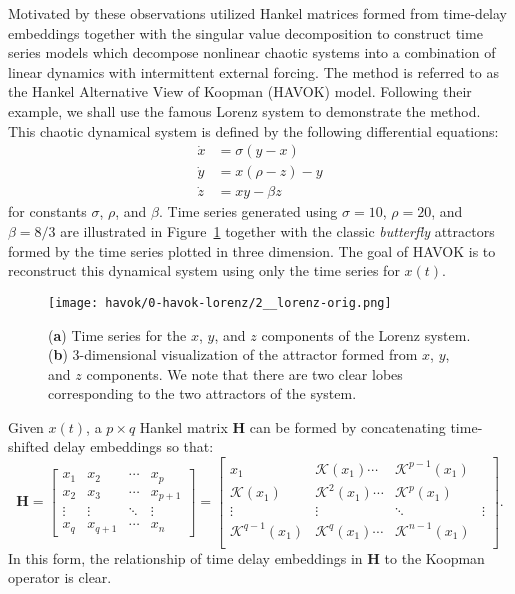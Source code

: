 Motivated by these observations \cite{brunton-havok-orig} utilized Hankel
matrices formed from time-delay embeddings together with the singular value
decomposition to construct time series models which decompose nonlinear chaotic
systems into a combination of linear dynamics with intermittent external
forcing. The method is referred to as the Hankel Alternative View of Koopman
(HAVOK) model. Following their example, we shall use the famous Lorenz system to
demonstrate the method. This chaotic dynamical system is defined by the
following differential equations:
\begin{align}
  \dot{x} &= \sigma(y-x) \\
  \dot{y} &= x(\rho-z) - y \\
  \dot{z} &= xy - \beta z
\end{align}
for constants $\sigma$, $\rho$, and $\beta$. Time series generated using $\sigma
=10$, $\rho=20$, and $\beta=8/3$ are illustrated in
Figure~\ref{fig:lorenz-time-series-orig} together with the classic
\textit{butterfly} attractors formed by the time series plotted in three
dimension. The goal of HAVOK is to reconstruct this dynamical system using only
the time series for $x(t)$.

\begin{figure}[h]
  \centering
  \texttt{[image: havok/0-havok-lorenz/2\_\_lorenz-orig.png]}
  \caption{(\textbf{a}) Time series for the $x$, $y$, and $z$ components of the
    Lorenz system. (\textbf{b}) 3-dimensional visualization of the attractor
    formed from $x$, $y$, and $z$ components. We note that there are two clear
    lobes corresponding to the two attractors of the system.}
  \label{fig:lorenz-time-series-orig}
\end{figure}


Given $x(t)$, a $p\times q$ Hankel matrix $\mathbf{H}$ can be formed by concatenating time-shifted
delay embeddings so that:
\begin{equation}
  \mathbf{H} = \begin{bmatrix}
    x_1 & x_2 & \cdots & x_p \\
    x_2 & x_3 & \cdots & x_{p+1} \\
    \vdots & \vdots & \ddots & \vdots \\
    x_q & x_{q+1} & \cdots & x_n
  \end{bmatrix} = \begin{bmatrix}
    x_1 & \mathcal{K}(x_1) \cdots & \mathcal{K}^{p-1}(x_1) \\
    \mathcal{K}(x_1) & \mathcal{K}^2(x_1) \cdots & \mathcal{K}^{p}(x_1) \\
    \vdots & \vdots & \ddots & \vdots \\
    \mathcal{K}^{q-1}(x_1) & \mathcal{K}^q(x_1) \cdots & \mathcal{K}^{n-1}(x_1) \\
  \end{bmatrix}.
\end{equation}
In this form, the relationship of time delay embeddings in $\mathbf{H}$ to the Koopman
operator is clear.

